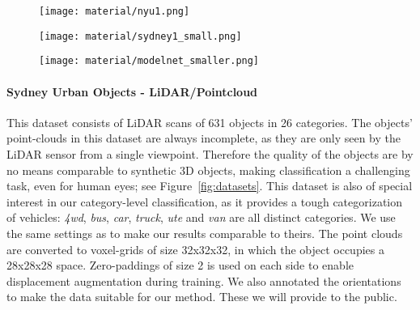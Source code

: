 \documentclass{bmvc2k}
\begin{document}
\begin{figure*}[!t]
  \begin{center}
    \begin{minipage}{\linewidth}
      \begin{subfigure}[b]{0.5\linewidth} \centering
        \texttt{[image: material/nyu1.png]}
      \end{subfigure}
      \begin{subfigure}[b]{.5\linewidth} \centering
        \texttt{[image: material/sydney1\_small.png]}
      \end{subfigure}
    \end{minipage}
    \begin{subfigure}[b]{\linewidth} \centering
      \texttt{[image: material/modelnet\_smaller.png]}
    \end{subfigure}
  \end{center}
  \caption{Examples from the various 3D datasets we used in experiments. On top, two exemplar scenes from the NYUv2~\cite{silberman_indoor_2012-1} \& Sydney~\cite{dedeuge_unsupervised_2013} datasets are depicted. On the bottom samples from the Modelnet dataset are displayed. The KITTI dataset is similar to the Sydney dataset and is not shown here.}
  \label{fig:datasets}
\end{figure*}

\paragraph{Sydney Urban Objects - LiDAR/Pointcloud}
This dataset consists of LiDAR scans of 631 objects in 26 categories. The objects' point-clouds in this dataset are always incomplete, as they are only seen by the LiDAR sensor from a single viewpoint. Therefore the quality of the objects are by no means comparable to synthetic 3D objects, making classification a challenging task, even for human eyes; see Figure~\ref{fig:datasets}. This dataset is also of special interest in our category-level classification, as it provides a tough categorization of vehicles: \emph{4wd}, \emph{bus}, \emph{car}, \emph{truck}, \emph{ute} and \emph{van} are all distinct categories.
We use the same settings as \cite{maturana_voxnet_2015} to make our results comparable to theirs. The point clouds are converted to voxel-grids of size 32x32x32, in which the object occupies a 28x28x28 space. Zero-paddings of size 2 is used on each side to enable displacement augmentation during training. We also annotated the orientations to make the data suitable for our method. These we will provide to the public. 
\end{document}
